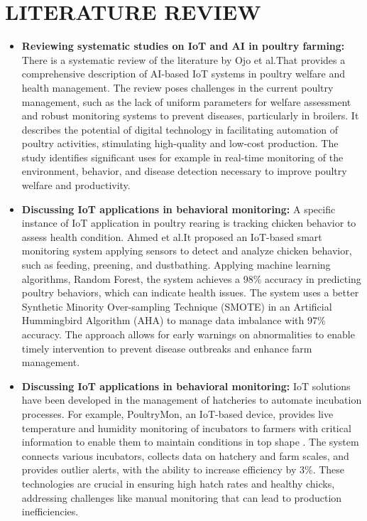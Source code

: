 \documentclass[../main.tex]{subfiles}
\begin{document}
\section{LITERATURE REVIEW}


 \begin{itemize}
        \item {  \textbf{Reviewing systematic studies on IoT and AI in poultry farming:}}
        There is a systematic review of the literature by Ojo et al.That provides a comprehensive description of AI-based IoT systems in poultry welfare and health management. The review poses challenges in the current poultry management, such as the lack of uniform parameters for welfare assessment and robust monitoring systems to prevent diseases, particularly in broilers. It describes the potential of digital technology in facilitating automation of poultry activities, stimulating high-quality and low-cost production. The study identifies significant uses for example in real-time monitoring of the environment, behavior, and disease detection necessary to improve poultry welfare and productivity.

        \item {\textbf{Discussing IoT applications in behavioral monitoring:}}
     A specific instance of IoT application in poultry rearing is tracking chicken behavior to assess health condition. Ahmed et al.It proposed an IoT-based smart monitoring system applying sensors to detect and analyze chicken behavior, such as feeding, preening, and dustbathing. Applying machine learning algorithms, Random Forest, the system achieves a 98\% accuracy in predicting poultry behaviors, which can indicate health issues. The system uses a better Synthetic Minority Over-sampling Technique (SMOTE) in an Artificial Hummingbird Algorithm (AHA) to manage data imbalance with 97\% accuracy. The approach allows for early warnings on abnormalities to enable timely intervention to prevent disease outbreaks and enhance farm management.

    
     \item {\textbf{ Discussing IoT applications in behavioral monitoring:}}
     IoT solutions have been developed in the management of hatcheries to automate incubation processes. For example, PoultryMon, an IoT-based device, provides live temperature and humidity monitoring of incubators to farmers with critical information to enable them to maintain conditions in top shape . The system connects various incubators, collects data on hatchery and farm scales, and provides outlier alerts, with the ability to increase efficiency by 3\%. These technologies are crucial in ensuring high hatch rates and healthy chicks, addressing challenges like manual monitoring that can lead to production inefficiencies.
    

\end{itemize}
\end{document}
